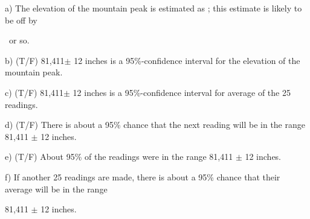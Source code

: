 \documentclass[10pt]{article}
\begin{document}
\hspace{20pt} a) The elevation of the mountain peak is estimated 
as \BL; this estimate is likely to be off by\vspace{-4pt}

\hspace{20pt}\hphantom{f) } \BL\ or so.
\bigskip
\bigskip

\hspace{20pt} b) (T/F) 81,411$\pm$ 12 inches is a 95\%-confidence interval for the elevation
of the mountain peak. 
\bigskip
\bigskip

\hspace{20pt} c) (T/F) 81,411$\pm$ 12 inches is a 95\%-confidence interval for 
average of the 25 readings.

\hspace{20pt} d) (T/F) There is about a 95\% chance that the next reading will be in 
the range 81,411 $\pm$ 12 inches.

\hspace{20pt} e) (T/F) About 95\% of the readings were in the range 81,411 $\pm$ 12 inches.

\hspace{20pt} f) If another 25 readings are made, there is about a 95\% chance that their
average will be in the range\vspace{-4pt}

\hspace{20pt}\hphantom{f) } 81,411 $\pm$ 12 inches.
\vfill
\eject
\end{document}
